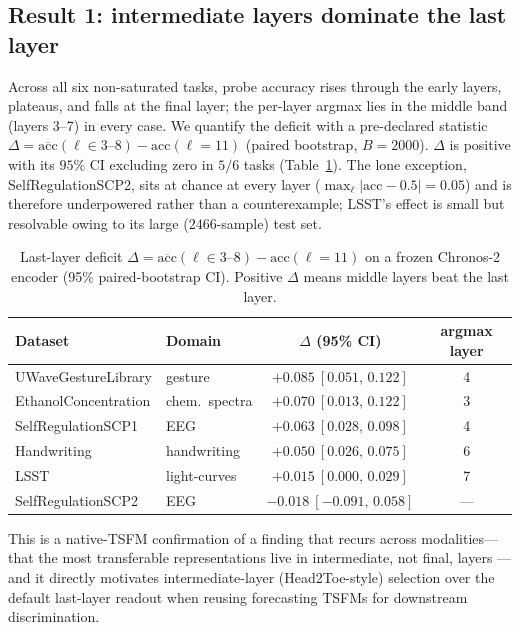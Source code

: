 \subsection{Result 1: intermediate layers dominate the last layer}
Across all six non-saturated tasks, probe accuracy rises through the early layers, plateaus,
and falls at the final layer; the per-layer argmax lies in the middle band (layers 3--7) in
every case. We quantify the deficit with a pre-declared statistic
$\Delta = \overline{\mathrm{acc}}(\ell\!\in\!3\text{--}8) - \mathrm{acc}(\ell\!=\!11)$
(paired bootstrap, $B{=}2000$). $\Delta$ is positive with its $95\%$ CI excluding zero in
$5/6$ tasks (Table~\ref{tab:latedrop}). The lone exception, SelfRegulationSCP2, sits at
chance at every layer ($\max_\ell|\mathrm{acc}-0.5|=0.05$) and is therefore underpowered
rather than a counterexample; LSST's effect is small but resolvable owing to its large
($2466$-sample) test set.

\begin{table}[t]
\centering
\caption{Last-layer deficit $\Delta=\overline{\mathrm{acc}}(\ell\!\in\!3\text{--}8)-\mathrm{acc}(\ell\!=\!11)$ on a frozen Chronos-2 encoder (95\% paired-bootstrap CI). Positive $\Delta$ means middle layers beat the last layer.}
\label{tab:latedrop}
\begin{tabular}{llcc}
\toprule
Dataset & Domain & $\Delta$ (95\% CI) & argmax layer \\
\midrule
UWaveGestureLibrary  & gesture        & $+0.085\ [0.051,\,0.122]$ & 4 \\
EthanolConcentration & chem.\ spectra & $+0.070\ [0.013,\,0.122]$ & 3 \\
SelfRegulationSCP1   & EEG            & $+0.063\ [0.028,\,0.098]$ & 4 \\
Handwriting          & handwriting    & $+0.050\ [0.026,\,0.075]$ & 6 \\
LSST                 & light-curves   & $+0.015\ [0.000,\,0.029]$ & 7 \\
SelfRegulationSCP2   & EEG            & $-0.018\ [-0.091,\,0.058]$ & --- \\
\bottomrule
\end{tabular}
\end{table}

This is a native-TSFM confirmation of a finding that recurs across modalities---that the most
transferable representations live in intermediate, not final, layers
\cite{evci2022head2toe, masarczyk2023tunnel, roschmann2025tivit, feofanov2026mantis}---and it
directly motivates intermediate-layer (Head2Toe-style) selection over the default last-layer
readout when reusing forecasting TSFMs for downstream discrimination.

